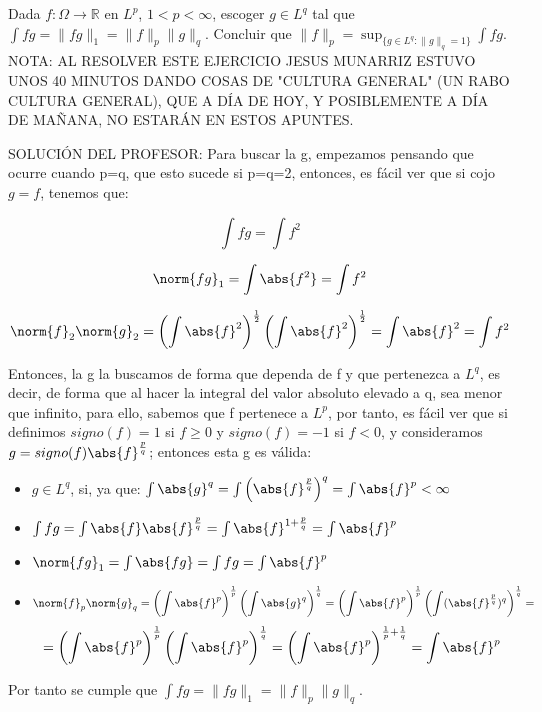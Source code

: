 \begin{problem}[4] Dada $f:\Omega\to \mathbb{R}$ en $L^p$,  $1 < p <  \infty$, escoger $g\in L^q$ tal que
$\int fg = \|fg\|_1 = \|f\|_p\|g\|_q$. Concluir que 
$\|f\|_p= \operatorname{sup}_{\{g\in L^q: \|g\|_q=1\}} \int fg $.
\solution
NOTA: AL RESOLVER ESTE EJERCICIO JESUS MUNARRIZ ESTUVO UNOS 40 MINUTOS DANDO COSAS DE "CULTURA GENERAL" (UN RABO CULTURA GENERAL), QUE A DÍA DE HOY, Y POSIBLEMENTE A DÍA DE MAÑANA, NO ESTARÁN EN ESTOS APUNTES.

SOLUCIÓN DEL PROFESOR:
Para buscar la g, empezamos pensando que ocurre cuando p=q, que esto sucede si p=q=2, entonces, es fácil ver que si cojo $g=f$, tenemos que:

\[
\int fg = \int f^2
\]

\[
\norm{fg}_1 = \int \abs{f^2} = \int f^2
\]

\[
\norm{f}_2 \norm{g}_2 = \left( \int \abs{f}^2 \right)^{\frac{1}{2}} \left( \int \abs{f}^2 \right)^{\frac{1}{2}} =  \int \abs{f}^2 = \int f^2
\]

Entonces, la g la buscamos de forma que dependa de f y  que pertenezca a $L^q$, es decir, de forma que al hacer la integral del valor absoluto elevado a q, sea menor que infinito, para ello, sabemos que f pertenece a $L^p$, por tanto, es fácil ver que si definimos $signo(f)=1$ si $f\geq0$ y $signo(f)=-1$ si $f<0$, y consideramos $g=signo(f)\abs{f}^\frac{p}{q}$; entonces esta g es válida:

\begin{itemize}
\item $g \in L^q$, si, ya que: $\int \abs{g}^q = \int\left( \abs{f}^{\frac{p}{q}}\right)^q = \int \abs{f}^p < \infty$
\item $\int fg = \int \abs{f} \abs{f}^{\frac{p}{q}} = \int \abs{f}^{1+\frac{p}{q}} = \int \abs{f}^p$
\item $\norm{fg}_1 = \int \abs{fg} = \int fg = \int \abs{f}^p$
\item $$\norm{f}_p\norm{g}_q = \left( \int \abs{f}^p \right)^\frac{1}{p} \left( \int \abs{g}^q \right)^\frac{1}{q} = \left( \int \abs{f}^p \right)^\frac{1}{p} \left( \int (\abs{f}^\frac{p}{q})^q \right)^\frac{1}{q} = $$
$$= \left( \int \abs{f}^p \right)^\frac{1}{p} \left( \int \abs{f}^p \right)^\frac{1}{q} = \left( \int \abs{f}^{p}\right)^{\frac{1}{p}+\frac{1}{q}} = \int \abs{f}^p$$
\end{itemize}

Por tanto se cumple que $\int fg = \|fg\|_1 = \|f\|_p\|g\|_q$.


\end{problem}
